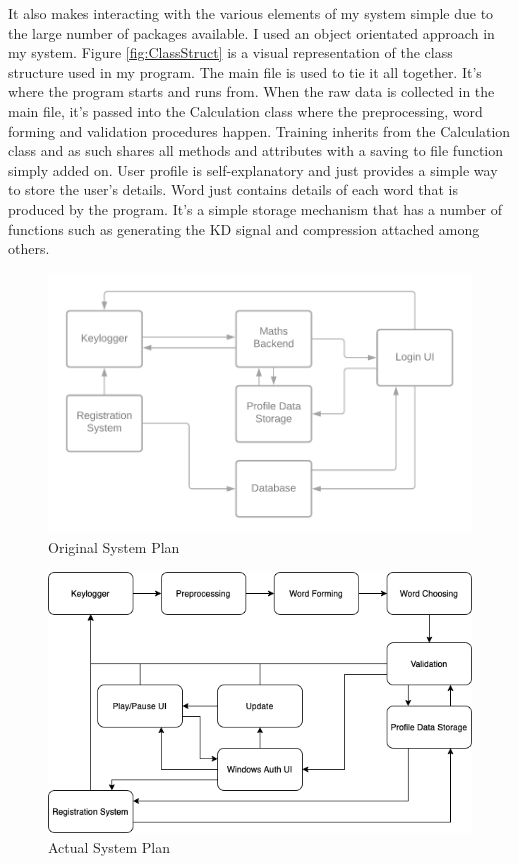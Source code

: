 \documentclass[10pt,a4paper]{report}
\begin{document}
It also makes interacting with the various elements of my system simple due to the large number of packages available. I used an object orientated approach in my system. Figure \ref{fig:ClassStruct} is a visual representation of the class structure used in my program. The main file is used to tie it all together. It's where the program starts and runs from. When the raw data is collected in the main file, it's passed into the Calculation class where the preprocessing, word forming and validation procedures happen. Training inherits from the Calculation class and as such shares all methods and attributes with a saving to file function simply added on.  User profile is self-explanatory and just provides a simple way to store the user's details. Word just contains details of each word that is produced by the program. It's a simple storage mechanism that has a number of functions such as generating the KD signal and compression attached among others.

\begin{figure}
	\includegraphics[scale=0.7]{OldPlan}
	\caption{Original System Plan}
	\label{fig:OldPlan}
\end{figure}

\begin{figure}
	\includegraphics[scale=0.6]{SystemPlan}
	\caption{Actual System Plan}
	\label{fig:NewPlan}
\end{figure}
\end{document}
